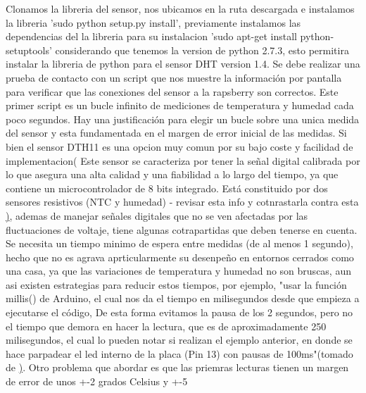 Clonamos la libreria del sensor, nos ubicamos en la ruta descargada  e instalamos la libreria 'sudo python setup.py install', previamente instalamos las dependencias del la libreria para su instalacion 'sudo apt-get install python-setuptools' considerando que tenemos la version de python 2.7.3, esto permitira instalar la libreria de python para el sensor DHT version 1.4. Se debe realizar una prueba de contacto con un script que nos muestre la información por pantalla para verificar que las conexiones del sensor a la rapsberry son correctos. Este primer script es un bucle infinito de mediciones de temperatura y humedad cada poco segundos. Hay una justificación para elegir un bucle sobre una unica medida del sensor y esta fundamentada en el margen de error inicial de las medidas. Si bien el sensor DTH11 es una opcion muy comun por su bajo coste y facilidad de implementacion( Este sensor se caracteriza por tener la señal digital calibrada por lo que asegura una alta calidad y una fiabilidad a lo largo del tiempo, ya que contiene un microcontrolador de 8 bits integrado. Está constituido por dos sensores resistivos (NTC y humedad) - revisar esta info y cotnrastarla contra esta \href{ https://programarfacil.com/blog/arduino-blog/sensor-dht11-temperatura-humedad-arduino/ }), ademas de manejar señales digitales que no se ven afectadas por las fluctuaciones de voltaje, tiene algunas cotrapartidas que deben tenerse en cuenta. Se necesita un tiempo minimo de espera entre medidas (de al menos 1 segundo), hecho que no es agrava aprticularmente su desenpeño en entornos cerrados como una casa, ya que las variaciones de temperatura y humedad no son bruscas, aun asi existen estrategias para reducir estos tiempos, por ejemplo, "usar la función millis() de Arduino, el cual nos da el tiempo en milisegundos desde que empieza a ejecutarse el código, De esta forma evitamos la pausa de los 2 segundos, pero no el tiempo que demora en hacer la lectura, que es de aproximadamente  250 milisegundos, el cual lo pueden notar si realizan el ejemplo anterior, en donde se hace parpadear el led interno de la placa (Pin 13) con pausas de 100ms"(tomado de \href{https://naylampmechatronics.com/blog/40_Tutorial-sensor-de-temperatura-y-humedad-DHT1.html}). Otro problema que abordar es que las priemras lecturas tienen un margen de error de unos +-2 grados Celsius y +-5%
